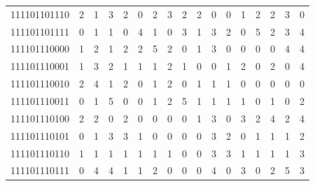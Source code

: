 \documentclass[10pt,a4paper]{article}
\begin{document}
\begin{longtable}{ |c|c|c|c|c|c|c|c|c|c|c|c|c|c|c|c|c| }
    111101101110              & 2                            & 1                                & 3                            & 2                              & 0   & 2   & 3   & 2   & 2   & 0   & 0   & 1   & 2   & 2   & 3   & 0   \\
    111101101111              & 0                            & 1                                & 1                            & 0                              & 4   & 1   & 0   & 3   & 1   & 3   & 2   & 0   & 5   & 2   & 3   & 4   \\
    111101110000              & 1                            & 2                                & 1                            & 2                              & 2   & 5   & 2   & 0   & 1   & 3   & 0   & 0   & 0   & 0   & 4   & 4   \\
    111101110001              & 1                            & 3                                & 2                            & 1                              & 1   & 1   & 2   & 1   & 0   & 0   & 1   & 2   & 0   & 2   & 0   & 4   \\
    111101110010              & 2                            & 4                                & 1                            & 2                              & 0   & 1   & 2   & 0   & 1   & 1   & 1   & 0   & 0   & 0   & 0   & 0   \\
    111101110011              & 0                            & 1                                & 5                            & 0                              & 0   & 1   & 2   & 5   & 1   & 1   & 1   & 1   & 0   & 1   & 0   & 2   \\
    111101110100              & 2                            & 2                                & 0                            & 2                              & 0   & 0   & 0   & 0   & 1   & 3   & 0   & 3   & 2   & 4   & 2   & 4   \\
    111101110101              & 0                            & 1                                & 3                            & 3                              & 1   & 0   & 0   & 0   & 0   & 3   & 2   & 0   & 1   & 1   & 1   & 2   \\
    111101110110              & 1                            & 1                                & 1                            & 1                              & 1   & 1   & 1   & 0   & 0   & 3   & 3   & 1   & 1   & 1   & 1   & 3   \\
    111101110111              & 0                            & 4                                & 4                            & 1                              & 1   & 2   & 0   & 0   & 0   & 4   & 0   & 3   & 0   & 2   & 5   & 3   \\

\end{longtable}
\end{document}
